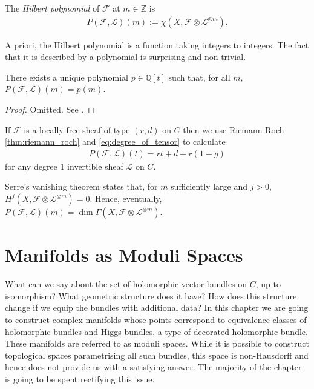 \documentclass[12pt]{ociamthesis}  %
\begin{document}
\begin{definition}
  The \emph{Hilbert polynomial} of $\mathscr F$ at $m\in\mathbb{Z}$
  is
  \begin{align*}
    P(\mathscr F,\mathscr L)(m) := \chi(X,\mathscr F \otimes \mathscr L^{\otimes m}).
  \end{align*}
\end{definition}

A priori, the Hilbert polynomial is a function taking integers to
integers. The fact that it is described by a polynomial is
surprising and non-trivial.

\begin{lemma}
  There exists a unique polynomial $p\in\mathbb{Q}[t]$ such that,
  for all $m$, $P(\mathscr F,\mathscr L)(m) = p(m)$.
  \begin{proof}
    Omitted. See \cite[Lemma 1.2.1]{huybrechts2010}.
  \end{proof}
\end{lemma}

\begin{example}\label{ex:hilbert_polynomial}
  If $\mathscr F$ is a locally free sheaf of type $(r,d)$
  on $C$ then we use Riemann-Roch \ref{thm:riemann_roch} and
  \ref{eq:degree_of_tensor} to calculate
  \begin{align*}
    P(\mathscr F, \mathscr L)(t) = rt + d + r(1-g)
  \end{align*}
  for any degree 1 invertible sheaf $\mathscr L$ on $C$.
\end{example}

Serre's vanishing theorem \cite[\href{https://stacks.math.columbia.edu/tag/0B5P}{Tag 0B5P}]{stacks-project}
states that, for $m$ sufficiently large and $j>0$,
$H^j(X,\mathscr F\otimes\mathscr L^{\otimes m})=0$. Hence,
eventually,
$P(\mathscr F,\mathscr L)(m) = \dim \Gamma(X,\mathscr F\otimes \mathscr L^{\otimes m})$.

\chapter{Manifolds as Moduli Spaces}

What can we say about the set of holomorphic vector bundles on $C$,
up to isomorphism? What geometric structure does it have? How does
this structure change if we equip the bundles with additional data?
In this chapter we are going to construct complex manifolds whose
points correspond to equivalence classes of holomorphic bundles
and Higgs bundles, a type of decorated holomorphic bundle. These
manifolds are referred to as moduli spaces. While it
is possible to construct topological spaces parametrising all such bundles,
this space is non-Hausdorff and hence does not provide us with a
satisfying answer. The majority of the chapter is going to be spent
rectifying this issue.
\end{document}
